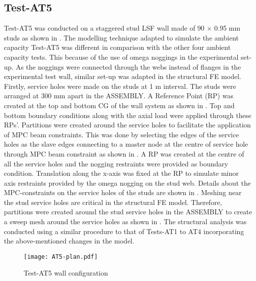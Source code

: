 \subsection*{Test-AT5}

Test-AT5 was conducted on a staggered stud LSF wall made of 90 $\times$ 0.95 mm studs as shown in . The modelling technique adapted to simulate the ambient capacity Test-AT5 was different in comparison with the other four ambient capacity tests. This because of the use of omega noggings in the experimental set-up. As the noggings were connected through the webs instead of flanges in the experimental test wall, similar set-up was adapted in the structural FE model. Firstly, service holes were made on the studs at 1 m interval. The studs were arranged at 300 mm apart in the ASSEMBLY. A Reference Point (RP) was created at the top and bottom CG of the wall system as shown in . Top and bottom boundary conditions along with the axial load were applied through these RPs'. Partitions were created around the service holes to facilitate the application of MPC beam constraints. This was done by selecting the edges of the service holes as the slave edges connecting to a master node at the centre of service hole through MPC beam constraint as shown in . A RP was created at the centre of all the service holes and the nogging restraints were provided as boundary condition. Translation along the x-axis was fixed at the RP to simulate minor axis restraints provided by the omega nogging on the stud web. Details about the MPC-constraints on the service holes of the studs are shown in . Meshing near the stud service holes are critical in the structural FE model. Therefore, partitions were created around the stud service holes in the ASSEMBLY to create a sweep mesh around the service holes as shown in . The structural analysis was conducted using a similar procedure to that of Tests-AT1 to AT4 incorporating the above-mentioned changes in the model.
\begin{figure}[!htbp]
	\centering
			\texttt{[image: AT5-plan.pdf]}\\
		\caption{Test-AT5 wall configuration}
		\label{fig:AT5-plan-fea}
\end{figure}    
